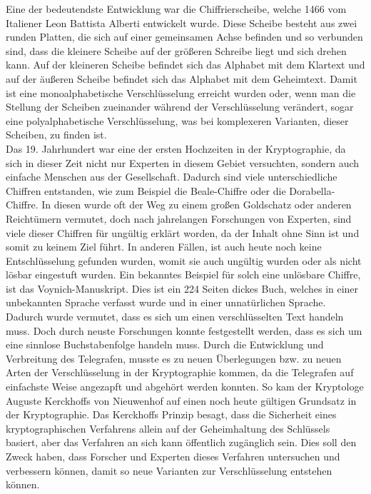 Eine der bedeutendste Entwicklung war die Chiffrierscheibe, welche 1466 vom Italiener Leon Battista Alberti entwickelt wurde. Diese Scheibe besteht aus zwei runden Platten, die sich auf einer gemeinsamen Achse befinden und so verbunden sind, dass die kleinere Scheibe auf der größeren Schreibe liegt und sich drehen kann. Auf der kleineren Scheibe befindet sich das Alphabet mit dem Klartext und auf der äußeren Scheibe befindet sich das Alphabet mit dem Geheimtext. Damit ist eine monoalphabetische Verschlüsselung erreicht wurden oder, wenn man die Stellung der Scheiben zueinander während der Verschlüsselung verändert, sogar eine polyalphabetische Verschlüsselung, was bei komplexeren Varianten, dieser Scheiben, zu finden ist.\\

Das 19. Jahrhundert war eine der ersten Hochzeiten in der Kryptographie, da sich in dieser Zeit nicht nur Experten in diesem Gebiet versuchten, sondern auch einfache Menschen aus der Gesellschaft. Dadurch sind viele unterschiedliche Chiffren entstanden, wie zum Beispiel die Beale-Chiffre oder die Dorabella-Chiffre. In diesen wurde oft der Weg zu einem großen Goldschatz oder anderen Reichtümern vermutet, doch nach jahrelangen Forschungen von Experten, sind viele dieser Chiffren für ungültig erklärt worden, da der Inhalt ohne Sinn ist und somit zu keinem Ziel führt. In anderen Fällen, ist auch heute noch keine Entschlüsselung gefunden wurden, womit sie auch ungültig wurden oder als nicht lösbar eingestuft wurden. 
Ein bekanntes Beispiel für solch eine unlösbare Chiffre, ist das Voynich-Manuskript. Dies ist ein 224 Seiten dickes Buch, welches in einer unbekannten Sprache verfasst wurde und in einer unnatürlichen Sprache. Dadurch wurde vermutet, dass es sich um einen verschlüsselten Text handeln muss. Doch durch neuste Forschungen konnte festgestellt werden, dass es sich um eine sinnlose Buchstabenfolge handeln muss. Durch die Entwicklung und Verbreitung des Telegrafen, musste es zu neuen Überlegungen bzw. zu neuen Arten der Verschlüsselung in der Kryptographie kommen, da die Telegrafen auf einfachste Weise angezapft und abgehört werden konnten. So kam der Kryptologe Auguste Kerckhoffs von Nieuwenhof auf einen noch heute gültigen Grundsatz in der Kryptographie. Das Kerckhoffs Prinzip besagt, dass die Sicherheit eines kryptographischen Verfahrens allein auf der Geheimhaltung des Schlüssels basiert, aber das Verfahren an sich kann öffentlich zugänglich sein. Dies soll den Zweck haben, dass Forscher und Experten dieses Verfahren untersuchen und verbessern können, damit so neue Varianten zur Verschlüsselung entstehen können.\\


